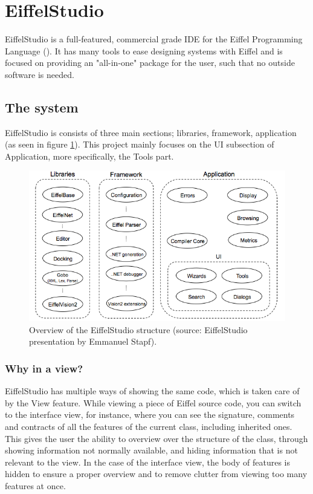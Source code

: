 \section{EiffelStudio}
EiffelStudio is a full-featured, commercial grade IDE for the Eiffel Programming Language (\cite[Quote from Origo website]{eiffel2006}). It has many tools to ease designing systems with Eiffel and is focused on providing an "all-in-one" package for the user, such that no outside software is needed.

\subsection{The system}
EiffelStudio is consists of three main sections; libraries, framework, application (as seen in figure \ref{fig:eiffelstudio_structure}). This project mainly focuses on the UI subsection of Application, more specifically, the Tools part.
\begin{figure}[h]
\centerline{
\includegraphics[scale=0.7]{images/eiffelstudio-structure-full.png}
}
\caption[Overview of the EiffelStudio structure]{Overview of the EiffelStudio structure (source: EiffelStudio presentation by Emmanuel Stapf).}
\label{fig:eiffelstudio_structure}
\end{figure}
\subsubsection{Why in a view?}
\label{why_a_view}
EiffelStudio has multiple ways of showing the same code, which is taken care of by the View feature. While viewing a piece of Eiffel source code, you can switch to the interface view, for instance, where you can see the signature, comments and contracts of all the features  of the current class, including inherited ones. This gives the user the ability to overview over the structure of the class, through showing information not normally available, and hiding information that is not relevant to the view. In the case of the interface view, the body of features is hidden to ensure a proper overview and to remove clutter from viewing too many features at once.
